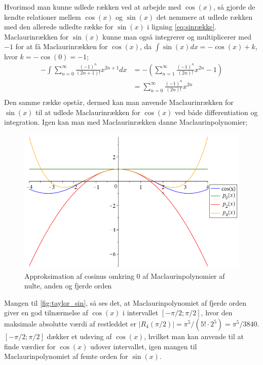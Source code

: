 Hvorimod man kunne udlede rækken ved at arbejde med $\cos(x)$, så gjorde de kendte relationer mellem $\cos(x)$ og $\sin(x)$ det nemmere at udlede rækken med den allerede udledte række for $\sin(x)$ i ligning \ref{eq:sinrække}. Maclaurinrækken  for $\sin(x)$ kunne man også integrerer og multiplicerer med $-1$ for at få Maclaurinrækken for $\cos(x)$, da $\int \sin(x) dx=-\cos(x)+k$, hvor $k=-\cos(0)=-1$;
\begin{align*}
-\int \sum_{n=0}^{\infty} \frac{(-1)^n}{(2n+1)!}x^{2n+1} dx
&=
-\left(\sum_{n=1}^{\infty} \frac{(-1)^n}{(2n)!}x^{2n}-1\right) \\
&=
\sum_{n=0}^{\infty} \frac{(-1)^n}{(2n)!}x^{2n} \\
\end{align*}
Den samme række opstår, dermed kan man anvende Maclaurinrækken for $\sin(x)$ til at udlede Maclaurinrækken for $\cos(x)$ ved både differentiation og integration. Igen kan man med Maclaurinrækken danne Maclaurinpolynomier;
\begin{figure}[H]
	\centering
	\includegraphics[scale=0.4]{fig/img/taylor_cos}
	\caption{Approksimation af cosinus omkring 0 af Maclaurinpolynomier af nulte, anden og fjerde orden}
 	\label{fig:taylor_cos}
\end{figure}
Mangen til \ref{fig:taylor_sin}, så ses det, at Maclaurinpolynomiet af fjerde orden giver en god tilnærmelse af $\cos(x)$ i intervallet $[-\pi /2; \pi /2]$, hvor den maksimale absolutte værdi af restleddet er $\left\lvert R_4(\pi/2) \right\lvert = \pi^5/(5! \cdot 2^5) = \pi^5/3840$. $[-\pi /2; \pi /2]$ dækker et udsving af $\cos(x)$, hvilket man kan anvende til at finde værdier for $\cos(x)$ udover intervallet, igen mangen til Maclaurinpolynomiet af femte orden for $\sin(x)$.

